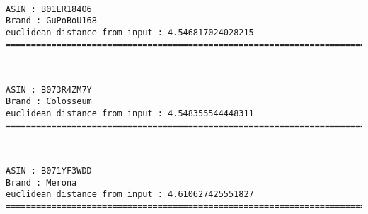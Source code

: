 \documentclass[11pt]{article}
\begin{document}
    
    
    \begin{center}
    \end{center}
    { \hspace*{\fill} \\}
    
    \begin{Verbatim}[commandchars=\\\{\}]
ASIN : B01ER184O6
Brand : GuPoBoU168
euclidean distance from input : 4.546817024028215
=============================================================================================================================

    \end{Verbatim}

    
    
    \begin{center}
    \end{center}
    { \hspace*{\fill} \\}
    
    \begin{Verbatim}[commandchars=\\\{\}]
ASIN : B073R4ZM7Y
Brand : Colosseum
euclidean distance from input : 4.548355544448311
=============================================================================================================================

    \end{Verbatim}

    
    
    \begin{center}
    \end{center}
    { \hspace*{\fill} \\}
    
    \begin{Verbatim}[commandchars=\\\{\}]
ASIN : B071YF3WDD
Brand : Merona
euclidean distance from input : 4.610627425551827
=============================================================================================================================

    \end{Verbatim}
\end{document}
